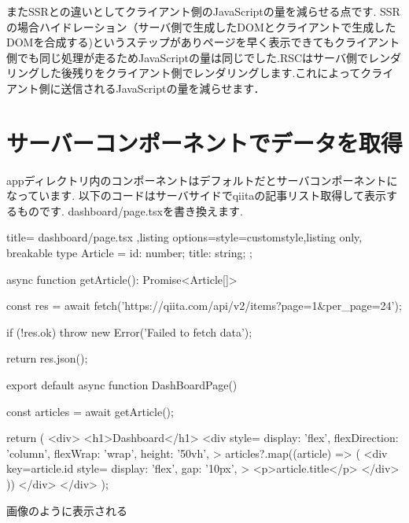 またSSRとの違いとしてクライアント側のJavaScriptの量を減らせる点です.
SSRの場合ハイドレーション（サーバ側で生成したDOMとクライアントで生成したDOMを合成する)というステップがありページを早く表示できてもクライアント側でも同じ処理が走るためJavaScriptの量は同じでした.RSCはサーバ側でレンダリングした後残りをクライアント側でレンダリングします.これによってクライアント側に送信されるJavaScriptの量を減らせます．


\section{サーバーコンポーネントでデータを取得}


appディレクトリ内のコンポーネントはデフォルトだとサーバコンポーネントになっています.
以下のコードはサーバサイドでqiitaの記事リスト取得して表示するものです.
dashboard/page.tsxを書き換えます.



\begin{tcblisting}{title={
        dashboard/page.tsx
      },listing options={style=customstyle},listing only, breakable}
  type Article = {
  id: number;
  title: string;
  };

  async function getArticle(): Promise<Article[]> {
    const res = await fetch('https://qiita.com/api/v2/items?page=1&per_page=24');

    if (!res.ok) {
        throw new Error('Failed to fetch data');
      }

    return res.json();
  }

  export default async function DashBoardPage() {
    const articles = await getArticle();

    return (
      <div>
        <h1>Dashboard</h1>
        <div
        style={{
            display: 'flex',
            flexDirection: 'column',
            flexWrap: 'wrap',
            height: '50vh',
          }}
        >
          {articles?.map((article) => (
            <div
            key={article.id}
            style={{
                display: 'flex',
                gap: '10px',
              }}
            >
              <p>{article.title}</p>
            </div>
            ))}
        </div>
      </div>
    );
  }


\end{tcblisting}






画像のように表示される

